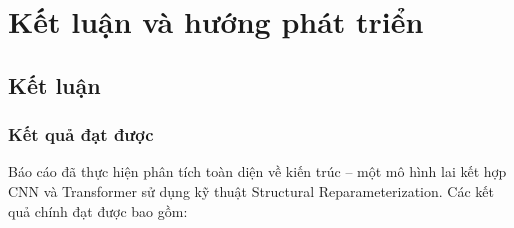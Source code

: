 \chapter{Kết luận và hướng phát triển}
\label{chap:conclusion}

\section{Kết luận}
\label{sec:conclusion}

\subsection{Kết quả đạt được}
\label{subsec:achievements}

Báo cáo đã thực hiện phân tích toàn diện về kiến trúc \fastvit{} \cite{fastvit2023} -- một mô hình lai kết hợp CNN và Transformer sử dụng kỹ thuật Structural Reparameterization. Các kết quả chính đạt được bao gồm:

